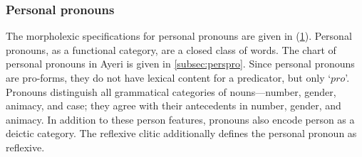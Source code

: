 \subsubsection{Personal pronouns}
\label{subsubsec:perspro}

The morpholexic specifications for personal pronouns are given in
(\ref{ex:perspromorphlex}). Personal pronouns, as a functional category, are a
closed class of words. The chart of personal pronouns in Ayeri is given in
\autoref{subsec:perspro}. Since personal pronouns are pro-forms, they do not
have lexical content for a predicator, but only `$pro$'. Pronouns distinguish
all grammatical categories of nouns---number, gender, animacy, and case; they
agree with their antecedents in number, gender, and animacy. In addition to
these person features, pronouns also encode person as a deictic category. The
reflexive clitic  additionally defines the personal pronoun as
reflexive.

\begin{figure}
\begin{morphlex}
\ex\label{ex:perspromorphlex}
\xe
\end{morphlex}
\end{figure}

